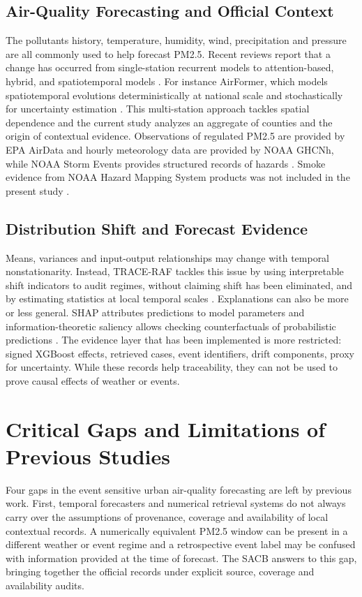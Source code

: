 \documentclass{ieeeaccess}
\begin{document}
\subsection{Air-Quality Forecasting and Official Context}
The pollutants history, temperature, humidity, wind, precipitation and pressure are all commonly used to help forecast PM2.5. Recent reviews report that a change has occurred from single-station recurrent models to attention-based, hybrid, and spatiotemporal models \cite{zhou2024pm25review,zhang2023sparsepm25}. For instance AirFormer, which models spatiotemporal evolutions deterministically at national scale and stochastically for uncertainty estimation \cite{liang2023airformer}. This multi-station approach tackles spatial dependence and the current study analyzes an aggregate of counties and the origin of contextual evidence. Observations of regulated PM2.5 are provided by EPA AirData and hourly meteorology data are provided by NOAA GHCNh, while NOAA Storm Events provides structured records of hazards \cite{epaairdata2026,noaaisd2026,noaastormevents2026}. Smoke evidence from NOAA Hazard Mapping System products was not included in the present study \cite{noaahms2026}.

\subsection{Distribution Shift and Forecast Evidence}
Means, variances and input-output relationships may change with temporal nonstationarity. Instead, TRACE-RAF tackles this issue by using interpretable shift indicators to audit regimes, without claiming shift has been eliminated, and by estimating statistics at local temporal scales \cite{liu2023san}. Explanations can also be more or less general. SHAP attributes predictions to model parameters \cite{lundberg2017shap} and information-theoretic saliency allows checking counterfactuals of probabilistic predictions \cite{raman2023forecast}. The evidence layer that has been implemented is more restricted: signed XGBoost effects, retrieved cases, event identifiers, drift components, proxy for uncertainty. While these records help traceability, they can not be used to prove causal effects of weather or events.

\section{Critical Gaps and Limitations of Previous Studies}

Four gaps in the event sensitive urban air-quality forecasting are left by previous work. First, temporal forecasters and numerical retrieval systems do not always carry over the assumptions of provenance, coverage and availability of local contextual records. A numerically equivalent PM2.5 window can be present in a different weather or event regime and a retrospective event label may be confused with information provided at the time of forecast. The SACB answers to this gap, bringing together the official records under explicit source, coverage and availability audits.
\end{document}

